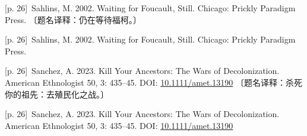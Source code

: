 \documentclass[10pt,a4paper]{article}
\begin{document}
\noindent\begin{minipage}{\textwidth}\begin{minipage}[t]{\dimexpr.5\textwidth-4mm\relax}\noindent\begin{minipage}[t]{\linewidth}{\scriptsize\color{gray} [p. 26]}\ Sahlins, M. 2002. Waiting for Foucault, Still. Chicago: Prickly Paradigm Press. 〔题名译释：仍在等待福柯。〕\par\end{minipage}\par\end{minipage}\hfill\begin{minipage}[t]{\dimexpr.5\textwidth-4mm\relax}\noindent\begin{minipage}[t]{\linewidth}{\scriptsize\color{gray} [p. 26]}\ Sahlins, M. 2002. Waiting for Foucault, Still. Chicago: Prickly Paradigm Press.\par\end{minipage}\par\end{minipage}\end{minipage}\par
\noindent\begin{minipage}{\textwidth}\begin{minipage}[t]{\dimexpr.5\textwidth-4mm\relax}\noindent\begin{minipage}[t]{\linewidth}{\scriptsize\color{gray} [p. 26]}\ Sanchez, A. 2023. Kill Your Ancestors: The Wars of Decolonization. American Ethnologist 50, 3: 435–45. DOI: \url{10.1111/amet.13190} 〔题名译释：杀死你的祖先：去殖民化之战。〕\par\end{minipage}\par\end{minipage}\hfill\begin{minipage}[t]{\dimexpr.5\textwidth-4mm\relax}\noindent\begin{minipage}[t]{\linewidth}{\scriptsize\color{gray} [p. 26]}\ Sanchez, A. 2023. Kill Your Ancestors: The Wars of Decolonization. American Ethnologist 50, 3: 435–45. DOI: \url{10.1111/amet.13190}\par\end{minipage}\par\end{minipage}\end{minipage}\par
\end{document}
